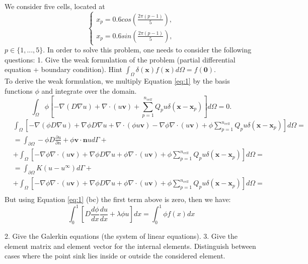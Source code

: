 \documentclass[a4paper,10pt]{report}
\begin{document}
We consider five cells, located at
\begin{equation*}
\begin{cases}
    x_p = 0.6 cos(\frac{2\pi(p − 1)}{5}),\\
     x_p = 0.6 sin(\frac{2\pi(p − 1)}{5}),
    \end{cases}
\end{equation*}
$p \in \{1, . . . , 5\}$. In order to solve this problem, one needs to consider the following
questions:
1. Give the weak formulation of the problem (partial differential equation +
boundary condition). Hint $\int_{\Omega }\delta (\mathbf{x}) f(\mathbf{x}) d \Omega =f(\mathbf{0})$.\\
To derive the weak formulation, we multiply Equation \eqref{eq:1} by the basis functions $\phi$ and integrate over the domain.\\
 \begin{equation}\label{eq:2}
 \int_{\Omega}\phi\left[ -\nabla (D\nabla{u})+\nabla \cdot (u\mathbf{v}) +\sum_{p=1}^{n_{cell}}Q_pu\delta(\mathbf{x}-\mathbf{x}_p)\right] d\Omega=0.
\end{equation}
  \begin{align*}
 &\int_{\Omega}\left[ -\nabla (\phi D\nabla{u})+\nabla\phi D\nabla{u}+ \nabla \cdot (\phi u\mathbf{v}) -\nabla \phi \nabla\cdot(u\mathbf{v})+\phi \sum_{p=1}^{n_{cell}}Q_pu\delta(\mathbf{x}-\mathbf{x}_p)\right] d\Omega=\\
  &=\int_{\partial\Omega} -\phi D\frac{\partial u}{\partial n}+\phi \mathbf{v}\cdot \mathbf{n}ud\Gamma +\\
  &+\int_{\Omega}\left[-\nabla \phi \nabla\cdot(u\mathbf{v})+\nabla\phi D\nabla{u}+\phi \nabla \cdot (u\mathbf{v}) +\phi \sum_{p=1}^{n_{cell}}Q_pu\delta(\mathbf{x}-\mathbf{x}_p)\right] d\Omega=\\
  &=\int_{\partial\Omega} K(u-u^{\infty})d\Gamma +\\
  &+\int_{\Omega}\left[-\nabla \phi \nabla\cdot(u\mathbf{v})+\nabla\phi D\nabla{u}+\phi \nabla \cdot (u\mathbf{v}) +\phi \sum_{p=1}^{n_{cell}}Q_pu\delta(\mathbf{x}-\mathbf{x}_p)\right] d\Omega=\\
\end{align*}
But using Equation \eqref{eq:1} (bc) the first term above is zero, then we have:
 \begin{equation}\label{eq:3}
\int_{0}^{1}\left[D\frac{d\phi}{dx}\frac{du}{dx}+\lambda \phi u \right]dx= \int_{0}^{1}\phi f(x)dx
\end{equation}

2. Give the Galerkin equations (the system of linear equations).
3. Give the element matrix and element vector for the internal elements.
Distinguish between cases where the point sink lies inside or outside the
considered element.
\end{document}
